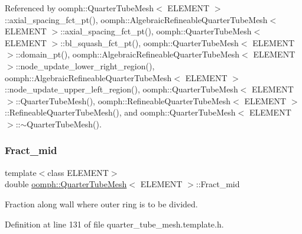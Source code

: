 Referenced by oomph\+::\+Quarter\+Tube\+Mesh$<$ E\+L\+E\+M\+E\+N\+T $>$\+::axial\+\_\+spacing\+\_\+fct\+\_\+pt(), oomph\+::\+Algebraic\+Refineable\+Quarter\+Tube\+Mesh$<$ E\+L\+E\+M\+E\+N\+T $>$\+::axial\+\_\+spacing\+\_\+fct\+\_\+pt(), oomph\+::\+Quarter\+Tube\+Mesh$<$ E\+L\+E\+M\+E\+N\+T $>$\+::bl\+\_\+squash\+\_\+fct\+\_\+pt(), oomph\+::\+Quarter\+Tube\+Mesh$<$ E\+L\+E\+M\+E\+N\+T $>$\+::domain\+\_\+pt(), oomph\+::\+Algebraic\+Refineable\+Quarter\+Tube\+Mesh$<$ E\+L\+E\+M\+E\+N\+T $>$\+::node\+\_\+update\+\_\+lower\+\_\+right\+\_\+region(), oomph\+::\+Algebraic\+Refineable\+Quarter\+Tube\+Mesh$<$ E\+L\+E\+M\+E\+N\+T $>$\+::node\+\_\+update\+\_\+upper\+\_\+left\+\_\+region(), oomph\+::\+Quarter\+Tube\+Mesh$<$ E\+L\+E\+M\+E\+N\+T $>$\+::\+Quarter\+Tube\+Mesh(), oomph\+::\+Refineable\+Quarter\+Tube\+Mesh$<$ E\+L\+E\+M\+E\+N\+T $>$\+::\+Refineable\+Quarter\+Tube\+Mesh(), and oomph\+::\+Quarter\+Tube\+Mesh$<$ E\+L\+E\+M\+E\+N\+T $>$\+::$\sim$\+Quarter\+Tube\+Mesh().

\mbox{\label{classoomph_1_1QuarterTubeMesh_ac7422bd566e566fd901bbbc98d8cb3b7}} 
\subsubsection{\texorpdfstring{Fract\+\_\+mid}{Fract\_mid}}
{\footnotesize\ttfamily template$<$class E\+L\+E\+M\+E\+NT$>$ \\
double \hyperlink{classoomph_1_1QuarterTubeMesh}{oomph\+::\+Quarter\+Tube\+Mesh}$<$ E\+L\+E\+M\+E\+NT $>$\+::Fract\+\_\+mid\hspace{0.3cm}{\ttfamily [protected]}}



Fraction along wall where outer ring is to be divided. 



Definition at line 131 of file quarter\+\_\+tube\+\_\+mesh.\+template.\+h.

\mbox{\label{classoomph_1_1QuarterTubeMesh_a961bf18652514913c6a63c4850088e8b}} 
